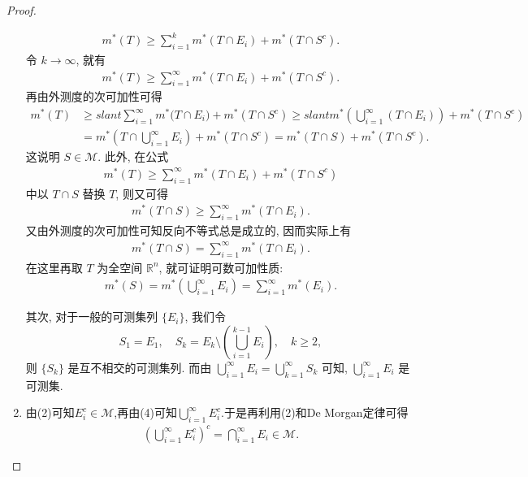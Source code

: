 \documentclass[../../main.tex]{subfiles}
\begin{document}
\begin{proof}
\begin{enumerate}[(1)]
\begin{align*}
m^*(T) \geqslant  \sum_{i = 1}^k m^*(T \cap E_i) + m^*(T \cap S^c).
\end{align*}
令 \(k \to \infty\), 就有
\begin{align*}
m^*(T) \geqslant  \sum_{i = 1}^{\infty} m^*(T \cap E_i) + m^*(T \cap S^c).
\end{align*}
再由外测度的次可加性可得
\begin{align*}
m^*(T)&\geqslant slant \sum_{i=1}^{\infty}{m^*(T}\cap E_i)+m^*(T\cap S^c)\geqslant slant m^*(\bigcup_{i=1}^{\infty}{\left( T\cap E_i \right)})+m^*(T\cap S^c)
\\
&=m^*(T\cap \bigcup_{i=1}^{\infty}{E_i})+m^*(T\cap S^c)=m^*(T\cap S)+m^*(T\cap S^c).
\end{align*}
这说明 \(S \in \mathscr{M}\).
此外, 在公式
\begin{align*}
m^*(T) \geqslant  \sum_{i = 1}^{\infty} m^*(T \cap E_i) + m^*(T \cap S^c)
\end{align*}
中以 \(T \cap S\) 替换 \(T\), 则又可得
\begin{align*}
m^*(T \cap S) \geqslant  \sum_{i = 1}^{\infty} m^*(T \cap E_i).
\end{align*}
又由外测度的次可加性可知反向不等式总是成立的, 因而实际上有
\begin{align*}
m^*(T \cap S) = \sum_{i = 1}^{\infty} m^*(T \cap E_i).
\end{align*}
在这里再取 \(T\) 为全空间 \(\mathbb{R}^n\), 就可证明可数可加性质:
\begin{align*}
m^*(S) = m^*\left(\bigcup_{i = 1}^{\infty} E_i\right) = \sum_{i = 1}^{\infty} m^*(E_i).
\end{align*}

其次, 对于一般的可测集列 \(\{E_i\}\), 我们令
\[
S_1 = E_1, \quad S_k = E_k \setminus \left(\bigcup_{i = 1}^{k - 1} E_i\right), \quad k \geqslant  2,
\]
则 \(\{S_k\}\) 是互不相交的可测集列. 而由 \(\bigcup_{i = 1}^{\infty} E_i = \bigcup_{k = 1}^{\infty} S_k\) 可知, \(\bigcup_{i = 1}^{\infty} E_i\) 是可测集.

\item 由(2)可知$E_i^c\in \mathscr{M}$,再由(4)可知$\bigcup_{i = 1}^{\infty} E_i^c$.于是再利用(2)和De Morgan定律可得
\begin{align*}
\left( \bigcup_{i=1}^{\infty}{E_{i}^{c}} \right) ^c=\bigcap_{i=1}^{\infty}{E_i}\in \mathscr{M} .
\end{align*}


\end{enumerate}
\end{proof}
\end{document}
